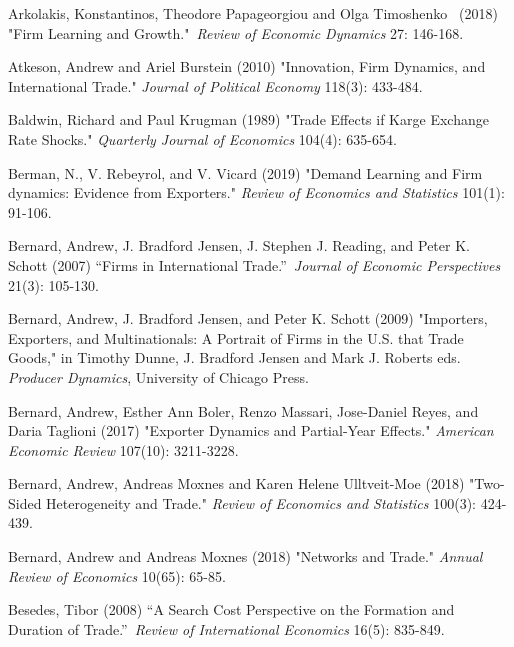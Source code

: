 \documentclass[12pt]{article}
\begin{document}
\begin{description}
\item Arkolakis, Konstantinos, Theodore Papageorgiou and Olga Timoshenko \
(2018) "Firm Learning and Growth."\textit{\ Review of Economic Dynamics}
27: 146-168.

\item Atkeson, Andrew and Ariel Burstein (2010) "Innovation, Firm Dynamics,
and International Trade." \textit{Journal of Political Economy} 118(3):
433-484.

\item Baldwin, Richard and Paul Krugman (1989) "Trade Effects if Karge
Exchange Rate Shocks." \textit{Quarterly Journal of Economics} 104(4):
635-654.

\item Berman, N., V. Rebeyrol, and V. Vicard (2019) "Demand Learning and
Firm dynamics: Evidence from Exporters." \textit{Review of Economics and
Statistics} 101(1): 91-106.

\item Bernard, Andrew, J. Bradford Jensen, J. Stephen J. Reading, and Peter
K. Schott (2007) \textquotedblleft Firms in International
Trade.\textquotedblright\ \textit{Journal of Economic Perspectives} 21(3):
105-130.

\item Bernard, Andrew, J. Bradford Jensen, and Peter K. Schott (2009) "Importers, Exporters, and Multinationals: A Portrait of Firms in the U.S. that Trade Goods," in Timothy Dunne, J. Bradford Jensen and Mark J. Roberts eds. \textit{Producer Dynamics}, University of Chicago Press.

\item Bernard, Andrew,  Esther Ann Boler, Renzo Massari, Jose-Daniel Reyes, and 
Daria Taglioni  (2017) "Exporter Dynamics and Partial-Year Effects."
 \textit{American Economic Review }107(10): 3211-3228.

\item Bernard, Andrew, Andreas Moxnes and Karen Helene Ulltveit-Moe (2018)
"Two-Sided Heterogeneity and Trade." \textit{Review of Economics and
Statistics }100(3): 424-439.

\item Bernard, Andrew and Andreas Moxnes (2018) "Networks and Trade." 
\textit{Annual Review of Economics} 10(65): 65-85.

\item Besedes, Tibor (2008) \textquotedblleft A Search Cost Perspective on the
Formation and Duration of Trade.\textquotedblright\ \textit{Review of International Economics} 16(5): 835-849.


\end{description}
\end{document}
